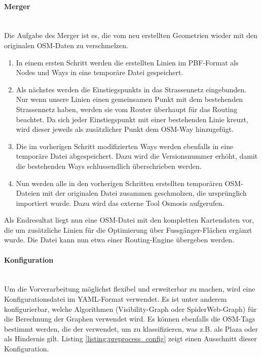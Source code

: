 \paragraph{Merger}\label{impl:Merger}~\\
Die Aufgabe des Merger ist es, die vom  neu erstellten Geometrien wieder mit den originalen \ac{OSM}-Daten zu verschmelzen.
\begin{enumerate}
    \item In einem ersten Schritt werden die erstellten Linien im \ac{PBF}-Format als \glspl{Node} und \glspl{Way} in eine temporäre Datei gespeichert.
    \item Als nächstes werden die \glspl{Einstiegspunkt} in das Strassennetz eingebunden. Nur wenn unsere Linien einen gemeinsamen Punkt mit dem bestehenden Strassennetz haben, werden sie vom Router überhaupt für das Routing beachtet. Da sich jeder Einstiegspunkt mit einer bestehenden Linie kreuzt, wird dieser jeweils als zusätzlicher Punkt dem \ac{OSM}-\gls{Way} hinzugefügt.
    \item Die im vorherigen Schritt modifizierten \glspl{Way} werden ebenfalls in eine temporäre Datei abgespeichert. Dazu wird die Versionsnummer erhöht, damit die bestehenden \glspl{Way} schlussendlich überschrieben werden.
    \item Nun werden alle in den vorherigen Schritten erstellten temporären \ac{OSM}-Dateien mit der originalen Datei zusammen geschmolzen, die ursprünglich importiert wurde. Dazu wird das externe Tool Osmosis \cite{osmosis} aufgerufen.
\end{enumerate}

Als Endresultat liegt nun eine \ac{OSM}-Datei mit den kompletten Kartendaten vor, die um zusätzliche Linien für die Optimierung über Fussgänger-Flächen ergänzt wurde. Die Datei kann nun etwa einer \gls{Routing-Engine} übergeben werden.

\paragraph{Konfiguration}\label{impl:preprocess_konfiguration}~\\
Um die Vorverarbeitung möglichst flexibel und erweiterbar zu machen, wird eine Konfigurationsdatei im YAML-Format verwendet. Es ist unter anderem konfigurierbar, welche Algorithmen (Visibility-Graph oder SpiderWeb-Graph) für die Berechnung der Graphen verwendet wird. Es können ebenfalls die \ac{OSM}-\glspl{Tag} bestimmt werden, die der  verwendet, um zu klassifizieren, was z.B. als Plaza oder als Hindernis gilt. Listing \ref{listing:preprocess_config} zeigt einen Ausschnitt dieser Konfiguration.

